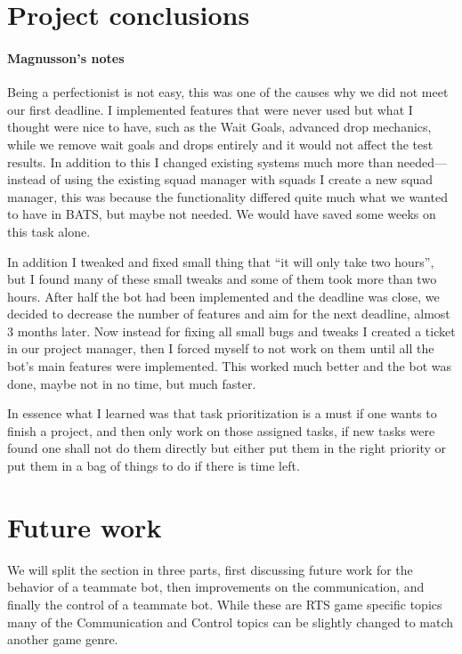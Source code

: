 \section{Project conclusions}
\paragraph{Magnusson's notes}
Being a perfectionist is not easy, this was one of the causes why we did not meet our first deadline. I implemented features that were never used but what I thought were nice to have, such as the Wait Goals, advanced drop mechanics, while we remove wait goals and drops entirely and it would not affect the test results.
In addition to this I changed existing systems much more than needed—instead of using the existing squad manager with squads I create a new squad manager, this was because the functionality differed quite much what we wanted to have in BATS, but maybe not needed. We would have saved some weeks on this task alone.

In addition I tweaked and fixed small thing that ``it will only take two hours'', but I found many of these small tweaks and some of them took more than two hours. After half the bot had been implemented and the deadline was close, we decided to decrease the number of features and aim for the next deadline, almost 3 months later. Now instead for fixing all small bugs and tweaks I created a ticket in our project manager, then I forced myself to not work on them until all the bot's main features were implemented. This worked much better and the bot was done, maybe not in no time, but much faster.

In essence what I learned was that task prioritization is a must if one wants to finish a project, and then only work on those assigned tasks, if new tasks were found one shall not do them directly but either put them in the right priority or put them in a bag of things to do if there is time left.

\section{Future work}
We will split the section in three parts, first discussing future work for the behavior of a teammate bot, then improvements on the communication, and finally the control of a teammate bot. While these are RTS game specific topics many of the Communication and Control topics can be slightly changed to match another game genre.

